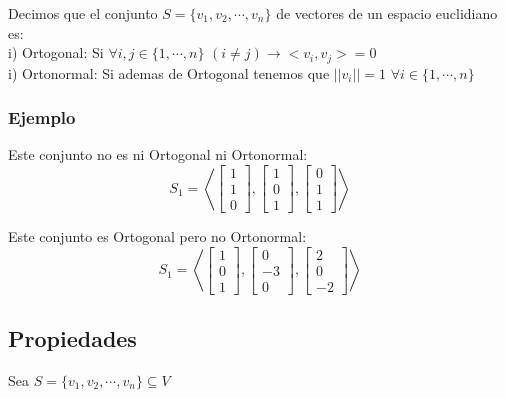 \documentclass[12pt]{report}							    %
\begin{document}
        Decimos que el conjunto $S = \{v_1, v_2, \cdots, v_n \}$ de vectores de un espacio euclidiano es: \\

        i) Ortogonal: Si $\forall i, j \in \{1, \cdots, n \}$ $(i\neq j) \to <v_i, v_j> = 0$ \\

        i) Ortonormal: Si ademas de Ortogonal tenemos que $||v_i|| = 1$ $\forall i\in \{1, \cdots, n \}$

        \subsubsection{Ejemplo}

        Este conjunto no es ni Ortogonal ni Ortonormal:
        \begin{equation*}
            S_1 = \left< \begin{bmatrix} 1\\1\\0\end{bmatrix} , \begin{bmatrix} 1\\0\\1\end{bmatrix}, \begin{bmatrix} 0\\1\\1\end{bmatrix} \right> 
        \end{equation*}

        Este conjunto es Ortogonal pero no Ortonormal:
        \begin{equation*}
            S_1 = \left< \begin{bmatrix} 1\\0\\1\end{bmatrix} , \begin{bmatrix} 0\\-3\\0\end{bmatrix}, \begin{bmatrix} 2\\0\\-2\end{bmatrix} \right> 
        \end{equation*}


        \subsection{Propiedades}
        Sea $S = \{ v_1 , v_2 , \cdots, v_n \} \subseteq V$
\end{document}
